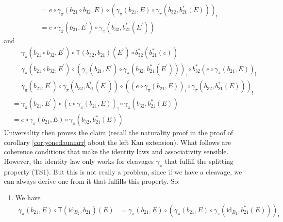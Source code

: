 \begin{enumerate}
\begin{align*}
  &=
  e
  \circ
  \gamma_{\pi}(b_{21} \circ b_{32},E)
  \circ
  \left(
    \gamma_{\pi}(b_{21},E)
    \circ
    \gamma_{\pi}(b_{32},b_{21}^{\ast}(E))
  \right)_{!}
  \\
  &=
  e
  \circ
  \gamma_{\pi}(b_{21},E^{\backprime})
  \circ
  \gamma_{\pi}(b_{32},b_{21}^{\ast}(E^{\backprime}))
\end{align*}
and
\begin{align*}
  &\phantom{=}
  \gamma_{\pi}(b_{21} \circ b_{32},E^{\backprime})
  \circ
  \mathsf{T}(b_{32},b_{21})
  \left(
    E^{\backprime}
  \right)
  \circ
  b_{32}^{\ast}
  \left(
    b_{21}^{\ast}(e)
  \right)
  \\
  &=
  \gamma_{\pi}(b_{21} \circ b_{32},E^{\backprime})
  \circ
  \left(
    \gamma_{\pi}(b_{21},E^{\backprime})
    \circ
    \gamma_{\pi}(b_{32},b_{21}^{\ast}(E^{\backprime}))
  \right)_{!}
  \circ
  b_{32}^{\ast}
  \left(
    e
    \circ
    \gamma_{\pi}(b_{21},E)
  \right)_{!}
  \\
  &=
  \gamma_{\pi}(b_{21},E^{\backprime})
  \circ
  \gamma_{\pi}(b_{32},b_{21}^{\ast}(E^{\backprime}))
  \circ
  \left(
    \left(
      e
      \circ
      \gamma_{\pi}(b_{21},E)
    \right)_{!}
    \circ
    \gamma_{\pi}(b_{32},b_{21}^{\ast}(E))
  \right)_{!}
  \\
  &=
  \gamma_{\pi}(b_{21},E^{\backprime})
  \circ
  \left(
    e
    \circ
    \gamma_{\pi}(b_{21},E)
  \right)_{!}
  \circ
  \gamma_{\pi}(b_{32},b_{21}^{\ast}(E))
  \\
  &=
  e
  \circ
  \gamma_{\pi}(b_{21},E)
  \circ
  \gamma_{\pi}(b_{32},b_{21}^{\ast}(E))
\end{align*}
Universality then proves the claim (recall the naturality proof in the proof of corollary \ref{cor:yonedauniarr} about the left Kan extension).
What follows are coherence conditions that make the identity laws and associativity sensible.
However, the identity law only works for cleavages $\gamma_{\pi}$ that fulfill the splitting property (TS1).
But this is not really a problem, since if we have a cleavage, we can always derive one from it that fulfills this property.
So:
\begin{enumerate}
\item[($\psi$1)]
We have
\begin{align*}
  \gamma_{\pi}(b_{21},E)
  \circ
  \mathsf{T}(\mathrm{id}_{B_{2}},b_{21})(E)
  &=
  \gamma_{\pi}(b_{21},E)
  \circ
  \left(
    \gamma_{\pi}(b_{21},E)
    \circ
    \gamma_{\pi}(\mathrm{id}_{B_{2}},b_{21}^{\ast}(E))
  \right)_{!}
  \\

\end{align*}
\end{enumerate}
\end{enumerate}
